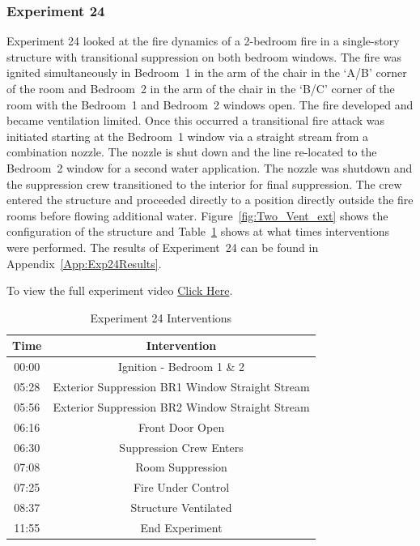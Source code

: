 \documentclass[12pt,oneside]{book}
\begin{document}
\subsubsection{Experiment 24}
Experiment 24 looked at the fire dynamics of a 2-bedroom fire in a single-story structure with transitional suppression on both bedroom windows. The fire was ignited simultaneously in Bedroom~1 in the arm of the chair in the `A/B' corner of the room and Bedroom~2 in the arm of the chair in the `B/C' corner of the room with the Bedroom~1 and Bedroom~2 windows open. The fire developed and became ventilation limited. Once this occurred a transitional fire attack was initiated starting at the Bedroom~1 window via a straight stream from a combination nozzle. The nozzle is shut down and the line re-located to the Bedroom~2 window for a second water application. The nozzle was shutdown and the suppression crew transitioned to the interior for final suppression. The crew entered the structure and proceeded directly to a position directly outside the fire rooms before flowing additional water. Figure~\ref{fig:Two_Vent_ext} shows the configuration of the structure and Table~\ref{Table:Exp24Interventions} shows at what times interventions were performed. The results of Experiment~24 can be found in Appendix~\ref{App:Exp24Results}. 

To view the full experiment video \href{https://player.vimeo.com/video/170499626?autoplay=1}{Click Here}.

\begin{table}[H]
	\centering
	\caption{Experiment 24 Interventions}
	\begin{tabular}{|c|c|} 
		\hline
		Time & Intervention \\ \hline \hline
		00:00 & Ignition - Bedroom 1 \& 2 \\ \hline
		05:28 & Exterior Suppression BR1 Window Straight Stream \\ \hline
		05:56 & Exterior Suppression BR2 Window Straight Stream \\ \hline		
		06:16 & Front Door Open \\ \hline
		06:30 & Suppression Crew Enters\\ \hline
		07:08 & Room Suppression \\ \hline 
		07:25 & Fire Under Control \\ \hline
		08:37 & Structure Ventilated \\ \hline
		11:55 & End Experiment\\ \hline
	\end{tabular}
	\label{Table:Exp24Interventions}
\end{table}
\end{document}
